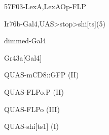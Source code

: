 \documentclass[17pt]{extarticle}
\begin{document}
\footnotesize
\vspace*{\fill}
\newpage{}
\vspace*{\fill}\begin{footnotesize}
57F03-LexA,LexAOp-FLP \\[0.5em]
\end{footnotesize}
\footnotesize
\vspace*{\fill}
\newpage{}
\vspace*{\fill}\begin{footnotesize}
Ir76b-Gal4,UAS>stop>shi[ts](5) \\[0.5em]
\end{footnotesize}
\footnotesize
\vspace*{\fill}
\newpage{}
\vspace*{\fill}\begin{normalsize}
dimmed-Gal4 \\[0.5em]
\end{normalsize}
\footnotesize
\vspace*{\fill}
\newpage{}
\vspace*{\fill}\begin{normalsize}
Gr43a[Gal4] \\[0.5em]
\end{normalsize}
\footnotesize
\vspace*{\fill}
\newpage{}
\vspace*{\fill}\begin{small}
QUAS-mCD8::GFP (II) \\[0.5em]
\end{small}
\footnotesize
\vspace*{\fill}
\newpage{}
\vspace*{\fill}\begin{small}
QUAS-FLPo.P (II) \\[0.5em]
\end{small}
\footnotesize
\vspace*{\fill}
\newpage{}
\vspace*{\fill}\begin{normalsize}
QUAS-FLPo (III) \\[0.5em]
\end{normalsize}
\footnotesize
\vspace*{\fill}
\newpage{}
\vspace*{\fill}\begin{small}
QUAS-shi[ts1] (I) \\[0.5em]
\end{small}
\end{document}
